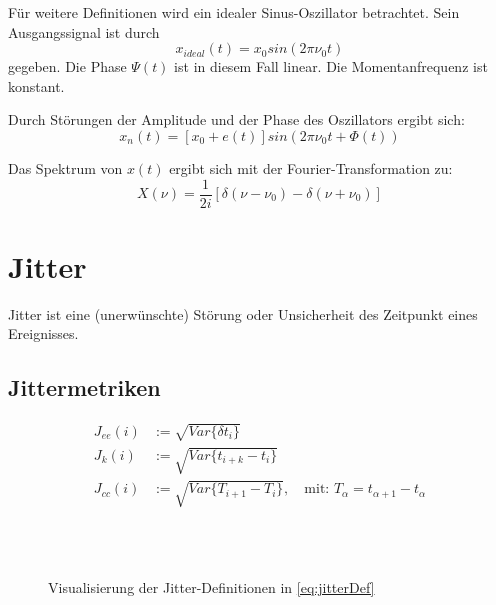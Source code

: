 Für weitere Definitionen wird ein idealer Sinus-Oszillator betrachtet. Sein Ausgangssignal ist durch
\begin{equation}
\label{eq:sinIdeal}
	x_{ideal}(t)=x_0 sin(2\pi \nu_0 t)
\end{equation}
gegeben. Die Phase $\Psi(t)$ ist in diesem Fall linear. Die Momentanfrequenz ist konstant.

Durch Störungen der Amplitude und der Phase des Oszillators ergibt sich:
\begin{equation}
	x_n(t)=[x_0 + e(t)] sin\left(2\pi \nu_0 t + \Phi(t)\right)
\end{equation}

Das Spektrum von $x(t)$ ergibt sich mit der Fourier-Transformation zu:
\begin{equation}
	X(\nu)=\frac{1}{2 i} \left[ \delta(\nu-\nu_0) - \delta(\nu+\nu_0) \right]
\end{equation}


\section{Jitter}

\begin{definition}[Jitter]
	Jitter ist eine (unerwünschte) Störung oder Unsicherheit des Zeitpunkt eines Ereignisses. \cite{Kundert2012}
\end{definition}

\subsection{Jittermetriken}

\begin{subequations}
	\label{eq:jitterDef}
	\begin{align}
	J_{ee}(i)&:=\sqrt{Var\{\delta t_i\}} \\
	J_k(i)&:=\sqrt{Var\{t_{i+k}-t_i\}} \\
	J_{cc}(i)&:=\sqrt{Var\{T_{i+1}-T_i\}}, \quad \text{mit: } T_\alpha=t_{\alpha+1}-t_\alpha
	\end{align}
\end{subequations}

\begin{figure}[H]
	\centering
	\\[4ex]
	\\[4ex]
	\caption{Visualisierung der Jitter-Definitionen in \autoref{eq:jitterDef}}
\end{figure}



